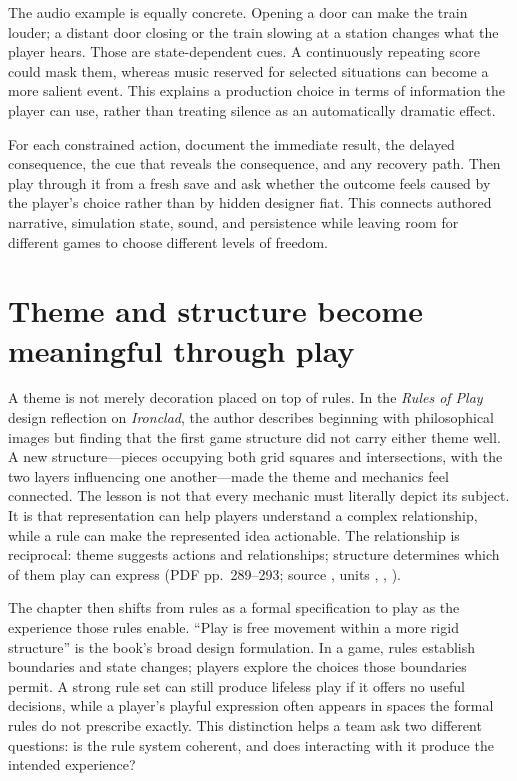 The audio example is equally concrete. Opening a door can make the train louder; a distant door closing or the train slowing at a station changes what the player hears. Those are state-dependent cues. A continuously repeating score could mask them, whereas music reserved for selected situations can become a more salient event. This explains a production choice in terms of information the player can use, rather than treating silence as an automatically dramatic effect.

For each constrained action, document the immediate result, the delayed consequence, the cue that reveals the consequence, and any recovery path. Then play through it from a fresh save and ask whether the outcome feels caused by the player's choice rather than by hidden designer fiat. This connects authored narrative, simulation state, sound, and persistence while leaving room for different games to choose different levels of freedom.

\section{Theme and structure become meaningful through play}\label{06-engine-ii-ch047-theme-and-structure-become-meaningful-through-play}

\hypertarget{06-engine-ii-ch047-theme-and-structure-become-meaningful-through-play}{}

A theme is not merely decoration placed on top of rules. In the \emph{Rules of Play} design reflection on \emph{Ironclad}, the author describes beginning with philosophical images but finding that the first game structure did not carry either theme well. A new structure---pieces occupying both grid squares and intersections, with the two layers influencing one another---made the theme and mechanics feel connected. The lesson is not that every mechanic must literally depict its subject. It is that representation can help players understand a complex relationship, while a rule can make the represented idea actionable. The relationship is reciprocal: theme suggests actions and relationships; structure determines which of them play can express (PDF pp.~289--293; source , units , , ).

The chapter then shifts from rules as a formal specification to play as the experience those rules enable. ``Play is free movement within a more rigid structure'' is the book's broad design formulation. In a game, rules establish boundaries and state changes; players explore the choices those boundaries permit. A strong rule set can still produce lifeless play if it offers no useful decisions, while a player's playful expression often appears in spaces the formal rules do not prescribe exactly. This distinction helps a team ask two different questions: is the rule system coherent, and does interacting with it produce the intended experience?

